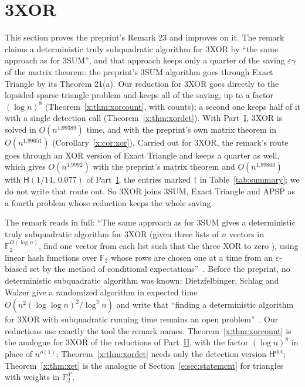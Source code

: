 \documentclass[11pt]{article}
\theoremstyle{definition}
\theoremstyle{remark}
\newcommand{\F}{\mathbb{F}_2}
\newcommand{\Hyp}{\mathsf{H}}
\newcommand{\ExpBestUp}{1.99389}%
\begin{document}
\section{3XOR}\label{x:sec:xor}

This section proves the preprint's Remark 23 and improves on it. The remark claims a deterministic truly subquadratic algorithm for 3XOR by ``the same approach as for 3SUM'', and that approach keeps only a quarter of the saving $\varepsilon\gamma$ of the matrix theorem: the preprint's 3SUM algorithm goes through Exact Triangle by its Theorem 21(a). Our reduction for 3XOR goes directly to the lopsided sparse triangle problem and keeps all of the saving, up to a factor $(\log n)^8$ (Theorem~\ref{x:thm:xorcount}, with counts); a second one keeps half of it with a single detection call (Theorem~\ref{x:thm:xordet}). With Part~\hyperref[m:partI]{I}, 3XOR is solved in $O(n^{\ExpBestUp})$ time, and with the preprint's own matrix theorem in $O(n^{1.99651})$ (Corollary~\ref{x:cor:xor}). Carried out for 3XOR, the remark's route goes through an XOR version of Exact Triangle and keeps a quarter as well, which gives $O(n^{1.9992})$ with the preprint's matrix theorem and $O(n^{1.99863})$ with $\Hyp(1/14,\,0.077)$ of Part~\hyperref[m:partI]{I}, the entries marked $\dagger$ in Table~\ref{tab:summary}; we do not write that route out. So 3XOR joins 3SUM, Exact Triangle and APSP as a fourth problem whose reduction keeps the whole saving.

The remark reads in full: ``The same approach as for 3SUM gives a deterministic truly subquadratic algorithm for 3XOR (given three lists of $n$ vectors in $\mathbb F_2^{O(\log n)}$, find one vector from each list such that the three XOR to zero \cite{JV16,DSW18}), using linear hash functions over $\mathbb F_2$ whose rows are chosen one at a time from an $\varepsilon$-biased set \cite{AGHP92} by the method of conditional expectations''~\cite[Remark~23]{ZT}. Before the preprint, no deterministic subquadratic algorithm was known: Dietzfelbinger, Schlag and Walzer give a randomized algorithm in expected time $O(n^2(\log\log n)^2/\log^2n)$ and write that ``finding a deterministic algorithm for 3XOR with subquadratic running time remains an open problem''~\cite[Theorems~5 and~7, p.~59:3]{DSW18}. Our reductions use exactly the tool the remark names. Theorem~\ref{x:thm:xorcount} is the analogue for 3XOR of the reductions of Part~\hyperref[m:partII]{II}, with the factor $(\log n)^8$ in place of $n^{o(1)}$; Theorem~\ref{x:thm:xordet} needs only the detection version $\Hyp^{\det}$; Theorem~\ref{x:thm:xet} is the analogue of Section~\ref{e:sec:statement} for triangles with weights in $\F^{d'}$.
\end{document}

